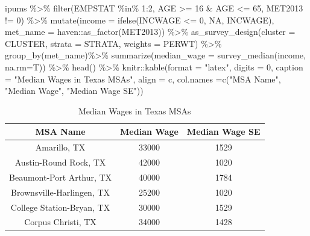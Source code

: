 \documentclass[
  letterpaper,
  DIV=11,
  numbers=noendperiod]{scrreprt}
\newenvironment{Shaded}{\begin{snugshade}}{\end{snugshade}}
\newcommand{\AttributeTok}[1]{\textcolor[rgb]{0.40,0.45,0.13}{#1}}
\newcommand{\ConstantTok}[1]{\textcolor[rgb]{0.56,0.35,0.01}{#1}}
\newcommand{\DecValTok}[1]{\textcolor[rgb]{0.68,0.00,0.00}{#1}}
\newcommand{\FunctionTok}[1]{\textcolor[rgb]{0.28,0.35,0.67}{#1}}
\newcommand{\NormalTok}[1]{\textcolor[rgb]{0.00,0.23,0.31}{#1}}
\newcommand{\SpecialCharTok}[1]{\textcolor[rgb]{0.37,0.37,0.37}{#1}}
\newcommand{\StringTok}[1]{\textcolor[rgb]{0.13,0.47,0.30}{#1}}
\begin{document}
\begin{Shaded}
\begin{Highlighting}[]
\NormalTok{ipums }\SpecialCharTok{\%\textgreater{}\%}
  \FunctionTok{filter}\NormalTok{(EMPSTAT }\SpecialCharTok{\%in\%} \DecValTok{1}\SpecialCharTok{:}\DecValTok{2}\NormalTok{,}
\NormalTok{         AGE }\SpecialCharTok{\textgreater{}=} \DecValTok{16} \SpecialCharTok{\&}\NormalTok{ AGE }\SpecialCharTok{\textless{}=} \DecValTok{65}\NormalTok{, }
\NormalTok{         MET2013 }\SpecialCharTok{!=} \DecValTok{0}\NormalTok{) }\SpecialCharTok{\%\textgreater{}\%}
  \FunctionTok{mutate}\NormalTok{(}\AttributeTok{income =} \FunctionTok{ifelse}\NormalTok{(INCWAGE }\SpecialCharTok{\textless{}=} \DecValTok{0}\NormalTok{, }\ConstantTok{NA}\NormalTok{, INCWAGE),}
         \AttributeTok{met\_name =}\NormalTok{ haven}\SpecialCharTok{::}\FunctionTok{as\_factor}\NormalTok{(MET2013)) }\SpecialCharTok{\%\textgreater{}\%}
  \FunctionTok{as\_survey\_design}\NormalTok{(}\AttributeTok{cluster =}\NormalTok{ CLUSTER,}
                   \AttributeTok{strata =}\NormalTok{ STRATA,}
                   \AttributeTok{weights =}\NormalTok{ PERWT) }\SpecialCharTok{\%\textgreater{}\%}
  \FunctionTok{group\_by}\NormalTok{(met\_name)}\SpecialCharTok{\%\textgreater{}\%}
  \FunctionTok{summarize}\NormalTok{(}\AttributeTok{median\_wage =} \FunctionTok{survey\_median}\NormalTok{(income, }\AttributeTok{na.rm=}\NormalTok{T)) }\SpecialCharTok{\%\textgreater{}\%}  
  \FunctionTok{head}\NormalTok{() }\SpecialCharTok{\%\textgreater{}\%}
\NormalTok{  knitr}\SpecialCharTok{::}\FunctionTok{kable}\NormalTok{(}\AttributeTok{format =} \StringTok{"latex"}\NormalTok{,}
               \AttributeTok{digits =} \DecValTok{0}\NormalTok{,}
               \AttributeTok{caption =} \StringTok{"Median Wages in Texas MSAs"}\NormalTok{,}
               \AttributeTok{align =} \StringTok{\textquotesingle{}c\textquotesingle{}}\NormalTok{,}
               \AttributeTok{col.names =}\FunctionTok{c}\NormalTok{(}\StringTok{"MSA Name"}\NormalTok{, }\StringTok{"Median Wage"}\NormalTok{, }\StringTok{"Median Wage SE"}\NormalTok{))}
\end{Highlighting}
\end{Shaded}

\begin{table}

\caption{Median Wages in Texas MSAs}
\centering
\begin{tabular}[t]{c|c|c}
\hline
MSA Name & Median Wage & Median Wage SE\\
\hline
Amarillo, TX & 33000 & 1529\\
\hline
Austin-Round Rock, TX & 42000 & 1020\\
\hline
Beaumont-Port Arthur, TX & 40000 & 1784\\
\hline
Brownsville-Harlingen, TX & 25200 & 1020\\
\hline
College Station-Bryan, TX & 30000 & 1529\\
\hline
Corpus Christi, TX & 34000 & 1428\\
\hline
\end{tabular}
\end{table}
\end{document}
